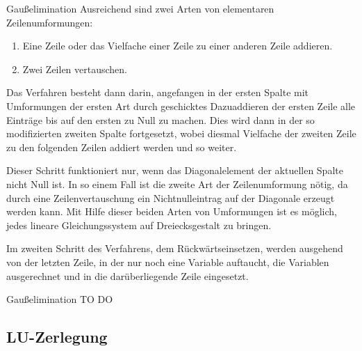 \begin{algo}{Gaußelimination}
    Ausreichend sind zwei Arten von elementaren Zeilenumformungen:
    \begin{enumerate}
        \item Eine Zeile oder das Vielfache einer Zeile zu einer anderen Zeile addieren.
        \item Zwei Zeilen vertauschen.
    \end{enumerate}

    Das Verfahren besteht dann darin, angefangen in der ersten Spalte mit Umformungen der ersten Art durch geschicktes Dazuaddieren der ersten Zeile alle Einträge bis auf den ersten zu Null zu machen.
    Dies wird dann in der so modifizierten zweiten Spalte fortgesetzt, wobei diesmal Vielfache der zweiten Zeile zu den folgenden Zeilen addiert werden und so weiter.

    Dieser Schritt funktioniert nur, wenn das Diagonalelement der aktuellen Spalte nicht Null ist.
    In so einem Fall ist die zweite Art der Zeilenumformung nötig, da durch eine Zeilenvertauschung ein Nichtnulleintrag auf der Diagonale erzeugt werden kann.
    Mit Hilfe dieser beiden Arten von Umformungen ist es möglich, jedes lineare Gleichungssystem auf Dreiecksgestalt zu bringen.

    Im zweiten Schritt des Verfahrens, dem Rückwärtseinsetzen, werden ausgehend von der letzten Zeile, in der nur noch eine Variable auftaucht, die Variablen ausgerechnet und in die darüberliegende Zeile eingesetzt.
\end{algo}

\begin{example}{Gaußelimination}
    TO DO
\end{example}

\subsection{LU-Zerlegung}


